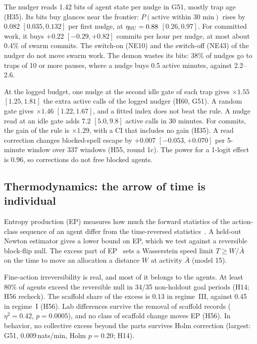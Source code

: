 The nudger reads 1.42 bits of agent state per nudge in G51, mostly trap age (H35).
Its bits buy glances near the frontier: $P(\text{active within 30 min})$ rises by 0.082 $[0.035, 0.132]$ per first nudge, at $\eta_{\rm SU}=0.88$ $[0.26, 0.97]$.
For committed work, it buys $+0.22$ $[-0.29, +0.82]$ commits per hour per nudge, at most about 0.4\% of swarm commits.
The switch-on (NE10) and the switch-off (NE43) of the nudger do not move swarm work.
The demon wastes its bits: 38\% of nudges go to traps of 10 or more pauses, where a nudge buys 0.5 active minutes, against 2.2--2.6.

At the logged budget, one nudge at the second idle gate of each trap gives $\times1.55$ $[1.25, 1.81]$ the extra active calls of the logged nudger (H60, G51).
A random gate gives $\times1.46$ $[1.22, 1.67]$, and a fitted index does not beat the rule.
A nudge read at an idle gate adds 7.2 $[5.0, 9.8]$ active calls in 30 minutes.
For commits, the gain of the rule is $\times1.29$, with a CI that includes no gain (H35).
A read correction changes blocked-spell escape by $+0.007$ $[-0.053, +0.070]$ per 5-minute window over 337 windows (H55, round 1c).
The power for a 1-logit effect is 0.96, so corrections do not free blocked agents.

\subsection{Thermodynamics: the arrow of time is individual}
\label{sec:info-thermo}

Entropy production (EP) measures how much the forward statistics of the action-class sequence of an agent differ from the time-reversed statistics~\cite{in:aguilera2026}.
A held-out Newton estimator gives a lower bound on EP, which we test against a reversible block-flip null.
The excess part of EP~\cite{in:kolchinsky2026} sets a Wasserstein speed limit $T\ge W/\bar A$ on the time to move an allocation a distance $W$ at activity $\bar A$ (model 15).

Fine-action irreversibility is real, and most of it belongs to the agents.
At least 80\% of agents exceed the reversible null in 34/35 non-holdout goal periods (H14; H56 recheck).
The scaffold share of the excess is 0.13 in regime~III, against 0.45 in regime~I (H56).
Lab differences survive the removal of scaffold records ($\eta^2=0.42$, $p=0.0005$), and no class of scaffold change moves EP (H56).
In behavior, no collective excess beyond the parts survives Holm correction (largest: G51, 0.009\,nats/min, Holm $p=0.20$; H14).


